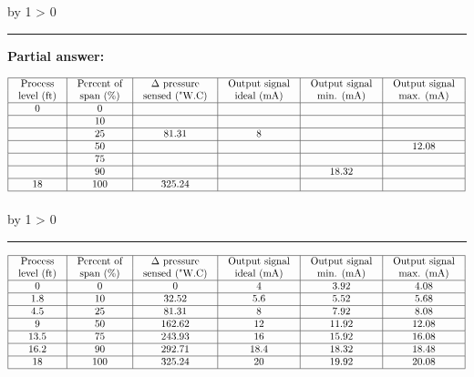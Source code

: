 \documentclass[12pt,a4paper]{article}
\def\svar{
           \advance\answnum by 1
           \ifnum \answnum > 0
                \hrule
                \vskip 3pt
                \leftline{Svar \the\answnum}
                \vskip 3pt \fi}
\def\notes{
           \advance\explnum by 1
           \ifnum \explnum > 0
                \hrule
                \vskip 3pt
                \leftline{Notes \the\explnum}
                \vskip 3pt \fi}
\begin{document}
\vskip 10pt \filbreak 





\svar{} 

\noindent
{\bf Partial answer:}


$$\vbox{\offinterlineskip
\halign{\strut
\vrule \quad\hfil # \ \hfil & 
\vrule \quad\hfil # \ \hfil & 
\vrule \quad\hfil # \ \hfil & 
\vrule \quad\hfil # \ \hfil & 
\vrule \quad\hfil # \ \hfil & 
\vrule \quad\hfil # \ \hfil \vrule \cr
\noalign{\hrule}
%
Process & Percent of & $\Delta$ pressure & Output signal & Output signal & Output signal \cr
%
level (ft) & span (\%) & sensed ("W.C) & ideal (mA) & min. (mA) & max. (mA) \cr
%
\noalign{\hrule}
%
0  & 0 &  &  &  &  \cr
%
\noalign{\hrule}
%
  & 10 &  &  &  &  \cr
%
\noalign{\hrule}
%
  & 25 & 81.31 & 8 &  &  \cr
%
\noalign{\hrule}
%
  & 50 &  &  &  & 12.08 \cr
%
\noalign{\hrule}
%
  & 75 &  &  &  &  \cr
%
\noalign{\hrule}
%
  & 90 &  &  & 18.32 &  \cr
%
\noalign{\hrule}
%
18 & 100 & 325.24 &  &  &  \cr
%
\noalign{\hrule}
} %
}$$ %

\vskip 10pt \filbreak 





\notes{} 


$$\vbox{\offinterlineskip
\halign{\strut
\vrule \quad\hfil # \ \hfil & 
\vrule \quad\hfil # \ \hfil & 
\vrule \quad\hfil # \ \hfil & 
\vrule \quad\hfil # \ \hfil & 
\vrule \quad\hfil # \ \hfil & 
\vrule \quad\hfil # \ \hfil \vrule \cr
\noalign{\hrule}
%
Process & Percent of & $\Delta$ pressure & Output signal & Output signal & Output signal \cr
%
level (ft) & span (\%) & sensed ("W.C) & ideal (mA) & min. (mA) & max. (mA) \cr
%
\noalign{\hrule}
%
0 & 0 & 0 & 4 & 3.92 & 4.08 \cr
%
\noalign{\hrule}
%
1.8 & 10 & 32.52 & 5.6 & 5.52 & 5.68 \cr
%
\noalign{\hrule}
%
4.5 & 25 & 81.31 & 8 & 7.92 & 8.08 \cr
%
\noalign{\hrule}
%
9 & 50 & 162.62 & 12 & 11.92 & 12.08 \cr
%
\noalign{\hrule}
%
13.5 & 75 & 243.93 & 16 & 15.92 & 16.08 \cr
%
\noalign{\hrule}
%
16.2 & 90 & 292.71 & 18.4 & 18.32 & 18.48 \cr
%
\noalign{\hrule}
%
18 & 100 & 325.24 & 20 & 19.92 & 20.08 \cr
%
\noalign{\hrule}
} %
}$$ %
\end{document}
